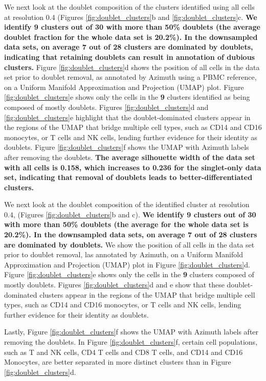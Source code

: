 \documentclass[unnumsec,webpdf,modern,large]{oup-authoring-template}
\begin{document}
	We next look at the doublet composition of the clusters identified using all cells at resolution 0.4 (Figures \ref{fig:doublet_clusters}b and \ref{fig:doublet_clusters}c. 
	\textbf{We identify 9 clusters out of 30 with more than 50\% doublets (the average doublet fraction for the whole data set is 20.2\%). 
	In the downsampled data sets, on average 7 out of 28 clusters are dominated by doublets, indicating that retaining doublets can result in annotation of dubious clusters.} 
	Figure \ref{fig:doublet_clusters}d shows the position of all cells in the data set prior to doublet removal, as annotated by Azimuth using a PBMC reference, on a Uniform Manifold Approximation and Projection (UMAP) plot. 
	Figure \ref{fig:doublet_clusters}e shows only the cells in the \textbf{9} clusters identified as being composed of mostly doublets. 
	Figures \ref{fig:doublet_clusters}d and \ref{fig:doublet_clusters}e highlight that the doublet-dominated clusters appear in the regions of the UMAP that bridge multiple cell types, such as CD14 and CD16 monocytes, or T cells and NK cells, lending further evidence for their identity as doublets. 
	Figure \ref{fig:doublet_clusters}f shows the UMAP with Azimuth labels after removing the doublets. 
\textbf{	The average silhouette width of the data set with all cells is 0.158, which increases to 0.236 for the singlet-only data set, indicating that removal of doublets leads to better-differentiated clusters. }
				
	We next look at the doublet composition of the identified cluster at resolution 0.4, (Figures \ref{fig:doublet_clusters}b and c). 
	\textbf{We identify 9 clusters out of 30 with more than 50\% doublets (the average for the whole data set is 20.2\%).
	In the downsampled data sets, on average 7 out of 28 clusters are dominated by doublets.}
	 We show the position of all cells in the data set prior to doublet removal, las annotated by Azimuth, on a Uniform Manifold Approximation and Projection (UMAP) plot in Figure \ref{fig:doublet_clusters}d. 
	 Figure \ref{fig:doublet_clusters}e shows only the cells in the \textbf{9} clusters composed of mostly doublets.
	 Figures \ref{fig:doublet_clusters}d and e show that these doublet-dominated clusters appear in the regions of the UMAP that bridge multiple cell types, such as CD14 and CD16 monocytes, or T cells and NK cells, lending further evidence for their identity as doublets. 
	 	 
	 Lastly, Figure \ref{fig:doublet_clusters}f shows the UMAP with Azimuth labels after removing the doublets. 
	 In Figure  \ref{fig:doublet_clusters}f, certain cell populations, such as T and NK cells, CD4 T cells and CD8 T cells, and CD14 and CD16 Monocytes, are better separated in more distinct clusters than in Figure  \ref{fig:doublet_clusters}d.
	 
\end{document}
